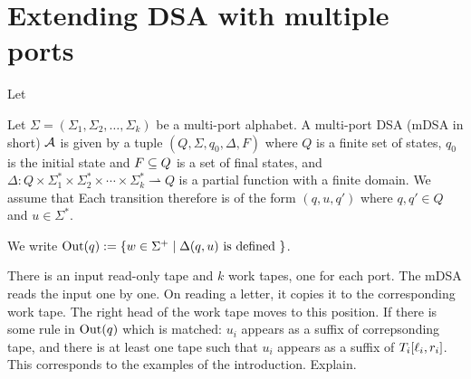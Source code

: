 \section{Extending DSA with multiple ports}

Let 

\begin{definition}
    Let $\Sigma = (\Sigma_1, \Sigma_2, \dots, \Sigma_k)$ be a multi-port alphabet. A multi-port DSA (mDSA in short) $\mathcal{A}$ is given by a tuple $(Q, \Sigma, q_0, \Delta, F)$ where $Q$ is a finite set of states, $q_0$ is the initial state and $F \subseteq Q$ is a set of final states, and $\Delta : Q \times \Sigma_1^* \times \Sigma_2^* \times \cdots \times \Sigma_k^* \rightharpoonup Q$ is a  partial function with a finite domain. We assume that  Each transition therefore is of the form $(q, u, q')$ where $q, q' \in Q$ and $u \in \Sigma^*$. 
    
    We write $\operatorname{Out}(q) := \{ w \in \Sigma^+ \mid \Delta(q, u) \text{ is defined }\}$.
    \end{definition}

    There is an input read-only tape  and $k$ work tapes, one for each port. The mDSA reads the input one by one. On reading a letter, it copies it to the corresponding work tape. The right head of the work tape moves to this position. If there is some rule in $\operatorname{Out}(q)$ which is matched: $u_i$ appears as a suffix of correpsonding tape, and there is at least one tape such that $u_i$ appears as a suffix of $T_i[\ell_i, r_i]$. This corresponds to the examples of the introduction. Explain.

    